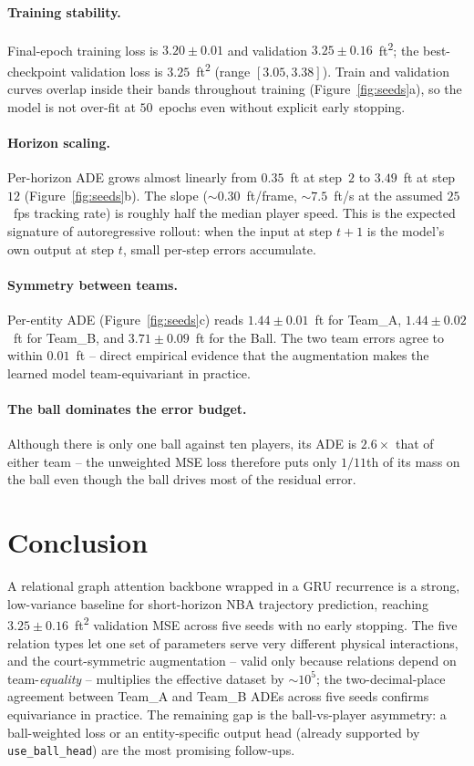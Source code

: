 \documentclass{article}
\begin{document}
\paragraph{Training stability.} Final-epoch training loss is
$3.20\pm 0.01$ and validation $3.25\pm 0.16$~ft\textsuperscript{2}; the
best-checkpoint validation loss is $3.25$~ft\textsuperscript{2} (range
$[3.05, 3.38]$). Train and validation curves overlap inside their bands
throughout training (Figure~\ref{fig:seeds}a), so the model is not over-fit
at $50$~epochs even without explicit early stopping.

\paragraph{Horizon scaling.} Per-horizon ADE grows almost linearly from
$0.35$~ft at step~$2$ to $3.49$~ft at step~$12$ (Figure~\ref{fig:seeds}b).
The slope ($\sim\!0.30$~ft/frame, $\sim\!7.5$~ft/s at the assumed $25$~fps
tracking rate) is roughly half the median player speed. This is the
expected signature of autoregressive rollout: when the input at step $t{+}1$
is the model's own output at step $t$, small per-step errors accumulate.

\paragraph{Symmetry between teams.} Per-entity ADE
(Figure~\ref{fig:seeds}c) reads $1.44\pm 0.01$~ft for Team\_A,
$1.44\pm 0.02$~ft for Team\_B, and $3.71\pm 0.09$~ft for the Ball. The two
team errors agree to within $0.01$~ft -- direct empirical evidence that the
augmentation makes the learned model team-equivariant in practice.

\paragraph{The ball dominates the error budget.} Although there is only one
ball against ten players, its ADE is $2.6\times$ that of either team -- the
unweighted MSE loss therefore puts only $1/11$th of its mass on the ball even
though the ball drives most of the residual error.

\section{Conclusion}
\label{sec:conc}

A relational graph attention backbone wrapped in a GRU recurrence is a
strong, low-variance baseline for short-horizon NBA trajectory prediction,
reaching $3.25\pm 0.16$~ft\textsuperscript{2} validation MSE across five
seeds with no early stopping. The five relation types let one set of
parameters serve very different physical interactions, and the
court-symmetric augmentation -- valid only because relations depend on
team-\emph{equality} -- multiplies the effective dataset by $\sim\!10^5$;
the two-decimal-place agreement between Team\_A and Team\_B ADEs across
five seeds confirms equivariance in practice. The remaining gap is the
ball-vs-player asymmetry: a ball-weighted loss or an entity-specific output
head (already supported by \texttt{use\_ball\_head}) are the most promising
follow-ups.
\end{document}
